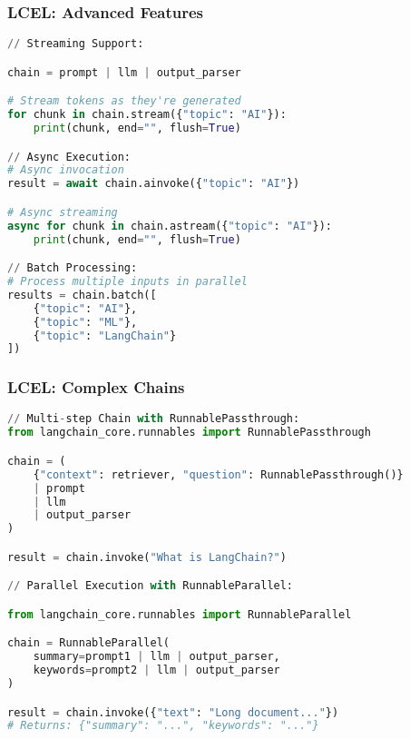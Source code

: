 \begin{frame}[fragile]\frametitle{LCEL: Advanced Features}

\begin{lstlisting}[language=python, basicstyle=\tiny]
// Streaming Support:

chain = prompt | llm | output_parser

# Stream tokens as they're generated
for chunk in chain.stream({"topic": "AI"}):
    print(chunk, end="", flush=True)

// Async Execution:
# Async invocation
result = await chain.ainvoke({"topic": "AI"})

# Async streaming
async for chunk in chain.astream({"topic": "AI"}):
    print(chunk, end="", flush=True)

// Batch Processing:
# Process multiple inputs in parallel
results = chain.batch([
    {"topic": "AI"},
    {"topic": "ML"},
    {"topic": "LangChain"}
])
\end{lstlisting}

\end{frame}

\begin{frame}[fragile]\frametitle{LCEL: Complex Chains}

\begin{lstlisting}[language=python, basicstyle=\tiny]
// Multi-step Chain with RunnablePassthrough:
from langchain_core.runnables import RunnablePassthrough

chain = (
    {"context": retriever, "question": RunnablePassthrough()}
    | prompt
    | llm
    | output_parser
)

result = chain.invoke("What is LangChain?")

// Parallel Execution with RunnableParallel:

from langchain_core.runnables import RunnableParallel

chain = RunnableParallel(
    summary=prompt1 | llm | output_parser,
    keywords=prompt2 | llm | output_parser
)

result = chain.invoke({"text": "Long document..."})
# Returns: {"summary": "...", "keywords": "..."}
\end{lstlisting}

\end{frame}

